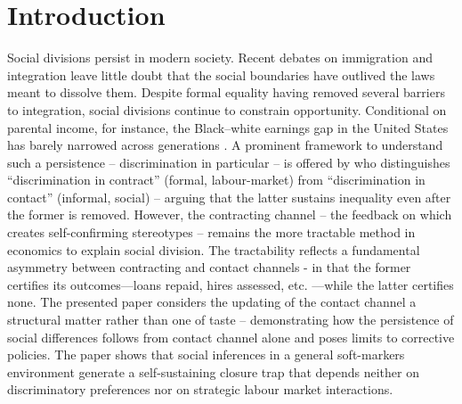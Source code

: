 \documentclass[pdflatex,sn-basic]{sn-jnl}
\theoremstyle{thmstyleone}
\numberwithin{proposition}{subsection}
\begin{document}
\maketitle




\section{Introduction}
\label{sec:intro}

Social divisions persist in modern society. Recent debates on immigration and integration leave little doubt that the social boundaries have outlived the laws meant to dissolve them. Despite formal equality having removed several barriers to integration, social divisions continue to constrain opportunity. Conditional on parental income, for instance, the Black–white earnings gap in the United States has barely narrowed across generations \citep{Chetty2020}. A prominent framework to understand such a persistence -- discrimination in particular -- is offered by \citet{Loury2002}
who distinguishes ``discrimination in contract'' (formal,
labour-market) from ``discrimination in contact'' (informal,
social) -- arguing that the latter sustains inequality even after
the former is removed. However, the contracting channel -- the feedback on which creates self-confirming stereotypes  -- remains the more tractable method in economics to explain social division. The tractability reflects a fundamental asymmetry between contracting and contact channels - in that the former certifies its outcomes---loans repaid, hires assessed, etc. ---while the latter certifies none.
The presented paper considers the updating of the contact channel a structural matter rather than one of taste -- demonstrating how the persistence of social differences follows from contact channel alone and poses limits to corrective policies. The paper shows that social inferences in a general soft-markers environment generate a self-sustaining closure trap that depends neither on discriminatory preferences nor on strategic labour market interactions.
\end{document}
